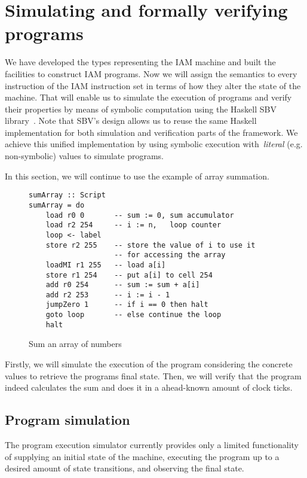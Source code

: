 \section{Simulating and formally verifying programs}

We have developed the types representing the IAM machine and built the facilities
to construct IAM programs. Now we will assign the semantics to every instruction
of the IAM instruction set in terms of how they alter the state of the machine.
That will enable us to simulate the execution of programs and verify their properties
by means of symbolic computation using the Haskell SBV library~\cite{SBV}.
Note that SBV's design allows us to reuse the same Haskell implementation for
both simulation and verification parts of the framework. We achieve this unified
implementation by using symbolic execution with~\emph{literal} (e.g. non-symbolic)
values to simulate programs.

In this section, we will continue to use the example of array summation.

\begin{figure}[H]
\begin{verbatim}
sumArray :: Script
sumArray = do
    load r0 0       -- sum := 0, sum accumulator
    load r2 254     -- i := n,   loop counter
    loop <- label
    store r2 255    -- store the value of i to use it
                    -- for accessing the array
    loadMI r1 255   -- load a[i]
    store r1 254    -- put a[i] to cell 254
    add r0 254      -- sum := sum + a[i]
    add r2 253      -- i := i - 1
    jumpZero 1      -- if i == 0 then halt
    goto loop       -- else continue the loop
    halt
\end{verbatim}
\caption{Sum an array of numbers}
\label{arraySum}
\end{figure}

Firstly, we will simulate the execution of the program considering the concrete
values to retrieve the programs final state. Then, we will verify that the program
indeed calculates the sum and does it in a ahead-known amount of clock ticks.

\subsection{Program simulation}

The program execution simulator currently provides only a limited functionality
of supplying an initial state of the machine, executing the program up to a
desired amount of state transitions, and observing the final state.

